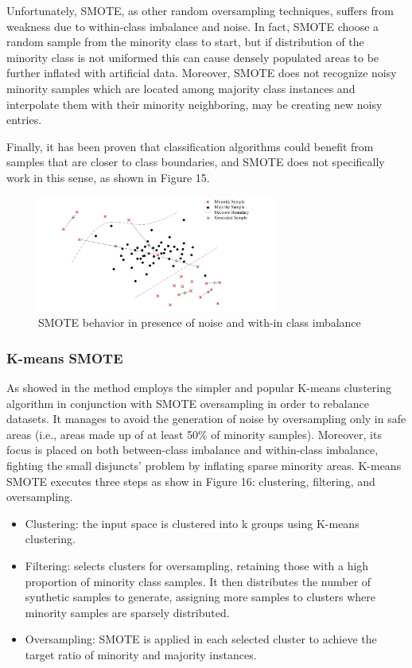 \documentclass{article}
\begin{document}
Unfortunately, SMOTE, as other random oversampling techniques, suffers from weakness due to within-class imbalance and noise. In fact, SMOTE choose a random sample from the minority class to start, but if distribution of the minority class is not uniformed this can cause densely populated areas to be further inflated with artificial data. Moreover, SMOTE does not recognize noisy minority samples which are located among majority class instances and interpolate them with their minority neighboring, may be creating new noisy entries.

Finally, it has been proven that classification algorithms could benefit from samples that are closer to class boundaries, and SMOTE does not specifically work in this sense, as shown in Figure 15.

\begin{figure}[H]
\centering
\includegraphics[width=0.7\textwidth]{smotebehaviour.png}
\caption{SMOTE behavior in presence of noise and with-in class imbalance \cite{dieci}}
\end{figure}

\subsubsection{K-means SMOTE}

As showed in \cite{dieci} the method employs the simpler and popular K-means clustering algorithm in conjunction with SMOTE oversampling in order to rebalance datasets. It manages to avoid the generation of noise by oversampling only in safe areas (i.e., areas made up of at least 50\% of minority samples). Moreover, its focus is placed on both between-class imbalance and within-class imbalance, fighting the small disjuncts' problem by inflating sparse minority areas.
K-means SMOTE executes three steps as show in Figure 16: clustering, filtering, and oversampling.

\begin{itemize}
    \item Clustering: the input space is clustered into k groups using K-means clustering. 
    \item Filtering: selects clusters for oversampling, retaining those with a high proportion of minority class samples. It then distributes the number of synthetic samples to generate, assigning more samples to clusters where minority samples are sparsely distributed. 
    \item Oversampling: SMOTE is applied in each selected cluster to achieve the target ratio of minority and majority instances.
\end{itemize}
\end{document}
